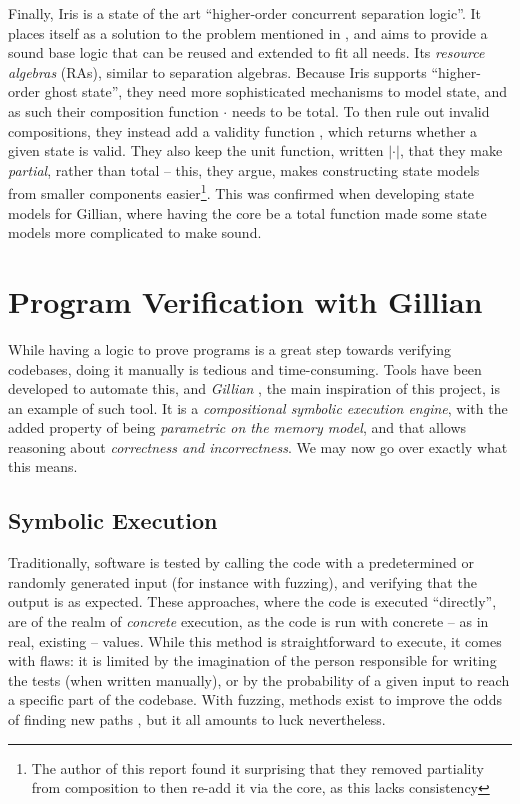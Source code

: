 Finally, Iris \cite{iris} is a state of the art ``higher-order concurrent separation logic''. It places itself as a solution to the problem mentioned in \cite{next700seplogics}, and aims to provide a sound base logic that can be reused and extended to fit all needs. Its \emph{resource algebras} (RAs), similar to separation algebras. Because Iris supports ``higher-order ghost state'', they need more sophisticated mechanisms to model state, and as such their composition function $\cdot$ needs to be total. To then rule out invalid compositions, they instead add a validity function \irisval, which returns whether a given state is valid. They also keep the unit function, written $|\cdot|$, that they make \emph{partial}, rather than total -- this, they argue, makes constructing state models from smaller components easier\footnote{The author of this report found it surprising that they removed partiality from composition to then re-add it via the core, as this lacks consistency}. This was confirmed when developing state models for Gillian, where having the core be a total function made some state models more complicated to make sound.

\section{Program Verification with Gillian}

While having a logic to prove programs is a great step towards verifying codebases, doing it manually is tedious and time-consuming. Tools have been developed to automate this, and \emph{Gillian} \cite{gillian0, gillian1, gillian2}, the main inspiration of this project, is an example of such tool. It is a \emph{compositional symbolic execution engine}, with the added property of being \emph{parametric on the memory model}, and that allows reasoning about \emph{correctness and incorrectness}. We may now go over exactly what this means.

\subsection{Symbolic Execution}

Traditionally, software is tested by calling the code with a predetermined or randomly generated input (for instance with fuzzing), and verifying that the output is as expected. These approaches, where the code is executed ``directly'', are of the realm of \emph{concrete} execution, as the code is run with concrete -- as in real, existing -- values. While this method is straightforward to execute, it comes with flaws: it is limited by the imagination of the person responsible for writing the tests (when written manually), or by the probability of a given input to reach a specific part of the codebase. With fuzzing, methods exist to improve the odds of finding new paths \cite{smartfuzzing}, but it all amounts to luck nevertheless.


